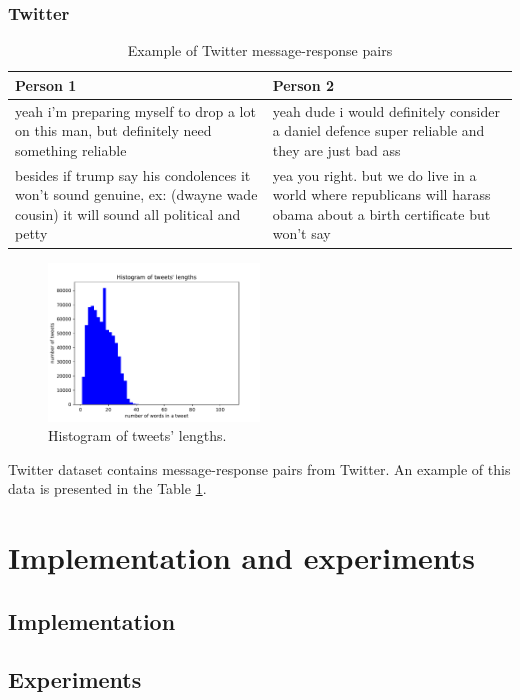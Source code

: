 \subsection{Twitter}
\begin{table}[ht]
\centering
 \begin{tabular}{|p{7cm}|p{7cm}|} 
 \hline\hline
 \textbf{Person 1} & \textbf{Person 2} \\
 \hline\hline
 yeah i'm preparing myself to drop a lot on this man, but definitely need something reliable & yeah dude i would definitely consider a daniel defence super reliable and they are just bad ass \\ 
 \hline
 besides if trump say his condolences it won't sound genuine, ex: (dwayne wade cousin) it will sound all political and petty & yea you right. but we do live in a world where republicans will harass obama about a birth certificate but won't say \\
 \hline\hline
 \end{tabular}
 \caption{Example of Twitter message-response pairs}
\label{tab:twitter_chat}
\end{table}


\begin{figure}[hbt]
  \centering
  \includegraphics[width=0.5\textwidth]{figures/tweet.pdf}
  \caption{Histogram of tweets' lengths.}
  \label{tweet}
\end{figure}

Twitter dataset contains message-response pairs from Twitter. An example of this data is presented in the Table \ref{tab:twitter_chat}. 


\chapter{Implementation and experiments}
\section{Implementation}
\section{Experiments}


